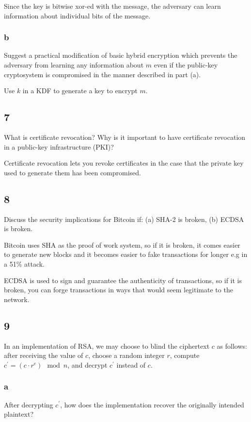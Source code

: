 \documentclass[11pt]{article}
\begin{document}
Since the key is bitwise xor-ed with the message, the adversary can learn information about individual bits of the message.

\subsubsection{b} Suggest a practical modiﬁcation of basic hybrid encryption which prevents the adversary from learning any information about $m$ even if the public-key cryptosystem is compromised in the manner described in part (a).

Use $k$ in a KDF to generate a key to encrypt $m$.

\subsection{7} What is certiﬁcate revocation? Why is it important to have certiﬁcate revocation in a public-key infrastructure (PKI)?

Certificate revocation lets you revoke certificates in the case that the private key used to generate them has been compromised.

\subsection{8} Discuss the security implications for Bitcoin if: (a) SHA-2 is broken, (b) ECDSA is broken.

Bitcoin uses SHA as the proof of work system, so if it is broken, it comes easier to generate new blocks and it becomes easier to fake transactions for longer e.g in a 51\% attack.

ECDSA is used to sign and guarantee the authenticity of transactions, so if it is broken, you can forge transactions in ways that would seem legitimate to the network.

\subsection{9} In an implementation of RSA, we may choose to blind the ciphertext $c$ as follows: after receiving the value of $c$, choose a random integer $r$, compute $c^\prime = (c \cdot r^e) \mod n$, and decrypt $c^\prime$ instead of $c$.

\subsubsection{a} After decrypting $c^\prime$, how does the implementation recover the originally intended plaintext?
\end{document}
